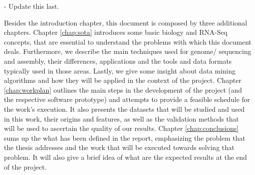 \begin{Notes}
- Update this last.\\
\end{Notes}

Besides the introduction chapter, this document is composed by three additional
chapters. Chapter \ref{chap:sota} introduces some basic biology and RNA-Seq
concepts, that are essential to understand the problems with which this document
deals. Furthermore, we describe the main techniques used for genome/\trans{}
sequencing and assembly, their differences, applications and the tools and data
formats typically used in those areas. Lastly, we give some insight about data
mining algorithms and how they will be applied in the context of the project.
Chapter \ref{chap:workplan} outlines the main steps in the development of the
project (and the respective software prototype) and attempts to provide a
feasible schedule for the work's execution. It also presents the datasets that
will be studied and used in this work, their origins and features, as well as
the validation methods that will be used to ascertain the quality of our
results. Chapter \ref{chap:conclusions} sums up the what has been defined in the
report, emphasizing the problem that the thesis addresses and the work that will
be executed towards solving that problem. It will also give a brief idea of what
are the expected results at the end of the project.
